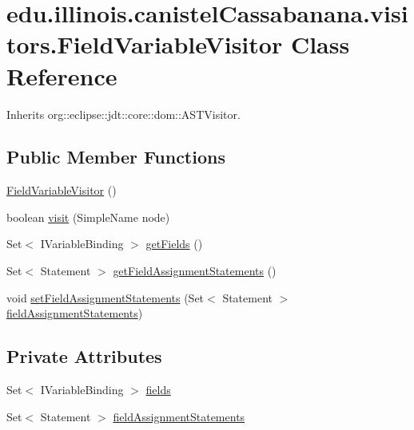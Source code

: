 \hypertarget{classedu_1_1illinois_1_1canistelCassabanana_1_1visitors_1_1FieldVariableVisitor}{
\section{edu.illinois.canistelCassabanana.visitors.FieldVariableVisitor Class Reference}
\label{classedu_1_1illinois_1_1canistelCassabanana_1_1visitors_1_1FieldVariableVisitor}
}


Inherits org::eclipse::jdt::core::dom::ASTVisitor.

\subsection*{Public Member Functions}
\begin{DoxyCompactItemize}
\item 
\hyperlink{classedu_1_1illinois_1_1canistelCassabanana_1_1visitors_1_1FieldVariableVisitor_ac48087402164194e11b127dfc1a2789b}{FieldVariableVisitor} ()
\item 
boolean \hyperlink{classedu_1_1illinois_1_1canistelCassabanana_1_1visitors_1_1FieldVariableVisitor_a027f6af8c69c787b9069f291fd8ea62b}{visit} (SimpleName node)
\item 
Set$<$ IVariableBinding $>$ \hyperlink{classedu_1_1illinois_1_1canistelCassabanana_1_1visitors_1_1FieldVariableVisitor_a3e516c7f4c19ade2a76e27986faa2922}{getFields} ()
\item 
Set$<$ Statement $>$ \hyperlink{classedu_1_1illinois_1_1canistelCassabanana_1_1visitors_1_1FieldVariableVisitor_a0b493a138734da451d99c34052d3197a}{getFieldAssignmentStatements} ()
\item 
void \hyperlink{classedu_1_1illinois_1_1canistelCassabanana_1_1visitors_1_1FieldVariableVisitor_a5bda72a70f1f5afaea622dbe82505dc2}{setFieldAssignmentStatements} (Set$<$ Statement $>$ \hyperlink{classedu_1_1illinois_1_1canistelCassabanana_1_1visitors_1_1FieldVariableVisitor_ad5f3c20acac29bcad4c77622dca4268b}{fieldAssignmentStatements})
\end{DoxyCompactItemize}
\subsection*{Private Attributes}
\begin{DoxyCompactItemize}
\item 
Set$<$ IVariableBinding $>$ \hyperlink{classedu_1_1illinois_1_1canistelCassabanana_1_1visitors_1_1FieldVariableVisitor_acaed6c0711716585d83b8b742b21ff15}{fields}
\item 
Set$<$ Statement $>$ \hyperlink{classedu_1_1illinois_1_1canistelCassabanana_1_1visitors_1_1FieldVariableVisitor_ad5f3c20acac29bcad4c77622dca4268b}{fieldAssignmentStatements}
\end{DoxyCompactItemize}


